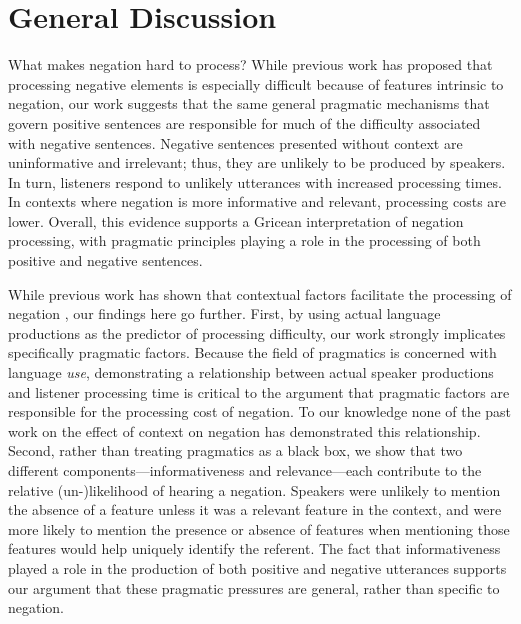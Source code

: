 \documentclass[man, noapacite]{apa2}
\begin{document}
\section{General Discussion}

What makes negation hard to process? While previous work has proposed that processing negative elements is especially difficult because of features intrinsic to negation, our work suggests that the same general pragmatic mechanisms that govern positive sentences are responsible for much of the difficulty associated with negative sentences. Negative sentences presented without context are uninformative and irrelevant; thus, they are unlikely to be produced by speakers. In turn, listeners respond to unlikely utterances with increased processing times. In contexts where negation is more informative and relevant, processing costs are lower. Overall, this evidence supports a Gricean interpretation of negation processing, with pragmatic principles playing a role in the processing of both positive and negative sentences.

While previous work has shown that contextual factors facilitate the processing of negation \cite{wason1965,nieuwland2008,dale2011,orenes2014}, our findings here go further. First, by using actual language productions as the predictor of processing difficulty, our work strongly implicates specifically pragmatic factors. Because the field of pragmatics is concerned with language \emph{use}, demonstrating a relationship between actual speaker productions and listener processing time is critical to the argument that pragmatic factors are responsible for the processing cost of negation. To our knowledge none of the past work on the effect of context on negation has demonstrated this relationship. Second, rather than treating pragmatics as a black box, we show that two different components---informativeness and relevance---each contribute to the relative (un-)likelihood of hearing a negation. Speakers were unlikely to mention the absence of a feature unless it was a relevant feature in the context, and were more likely to mention the presence or absence of features when mentioning those features would help uniquely identify the referent. The fact that informativeness played a role in the production of both positive and negative utterances supports our argument that these pragmatic pressures are general, rather than specific to negation. 
\end{document}
